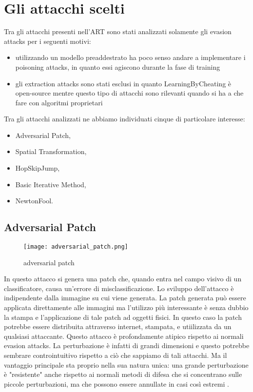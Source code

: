 \section{Gli attacchi scelti}
Tra gli attacchi presenti nell'ART sono stati analizzati solamente gli evasion attacks per i seguenti motivi:\begin{itemize}
    \item utilizzando un modello preaddestrato ha poco senso andare a implementare i poisoning attacks, in quanto essi agiscono durante la fase di training
    \item gli extraction attacks sono stati esclusi in quanto LearningByCheating è open-source mentre questo tipo di attacchi sono rilevanti quando si ha a che fare
    con algoritmi proprietari
\end{itemize}
Tra gli attacchi analizzati ne abbiamo individuati cinque di particolare interesse:\begin{itemize}
    \item Adversarial Patch,
    \item Spatial Transformation,
    \item HopSkipJump,
    \item Basic Iterative Method,
    \item NewtonFool.
\end{itemize}
\subsection{Adversarial Patch} 
\begin{figure}[h]
    \texttt{[image: adversarial\_patch.png]}
    \caption{adversarial patch\cite{patch}}
    \label{fig:patch}
\end{figure}
In questo attacco si genera una patch che, quando entra nel campo visivo di un classificatore, causa un'errore di misclassificazione. Lo sviluppo dell'attacco è 
indipendente dalla immagine su cui viene generata. La patch generata può essere applicata direttamente alle immagini ma l'utilizzo più interessante è senza dubbio la stampa e l'applicazione di tale patch
ad oggetti fisici. In questo caso la patch potrebbe essere distribuita attraverso internet, stampata, e utiilizzata da un qualsiasi attaccante. Questo attacco è profondamente atipico rispetto
ai normali evasion attacks. La perturbazione è infatti di grandi dimensioni e questo potrebbe sembrare controintuitivo rispetto a ciò che sappiamo di tali attacchi. Ma il vantaggio principale
sta proprio nella sua natura unica: una grande perturbazione è "resistente" anche rispetto ai normali metodi di difesa che si concentrano sulle piccole perturbazioni, ma che possono essere annullate in 
casi così estremi \cite{patch}.
